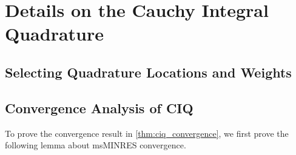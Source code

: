 \chapter{Details on the Cauchy Integral Quadrature}
\label{app:quadrature}

\section{Selecting Quadrature Locations and Weights}

\section{Convergence Analysis of CIQ}

To prove the convergence result in \cref{thm:ciq_convergence}, we first prove the following lemma about msMINRES convergence.

